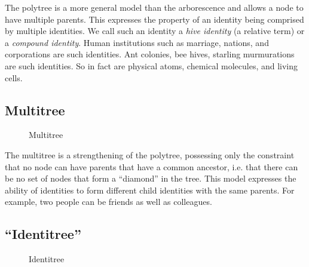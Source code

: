 \documentclass[pra,twocolumn,groupedaddress,10pt]{revtex4}
\theoremstyle{definition}
\begin{document}
The polytree\cite{polytree} is a more general model than the arborescence and allows a node to have multiple parents. This expresses the property of an identity being comprised by multiple identities. We call such an identity a \textit{hive identity} (a relative term) or a \textit{compound identity}. Human institutions such as marriage, nations, and corporations are such identities. Ant colonies, bee hives, starling murmurations are such identities. So in fact are physical atoms, chemical molecules, and living cells. %

\subsection{Multitree} \label{sec:multitree}

\begin{figure}[htp]
\centering
{}
\caption{\label{fig:multitree}Multitree}
\end{figure}

The multitree\cite{multitree} is a strengthening of the polytree, possessing only the constraint that no node can have parents that have a common ancestor, i.e. that there can be no set of nodes that form a ``diamond'' in the tree. This model expresses the ability of identities to form different child identities with the same parents. For example, two people can be friends as well as colleagues.

\subsection{``Identitree''} \label{sec:identitree}

\begin{figure}[htp]
\centering
{}
\caption{\label{fig:identitree}Identitree}
\end{figure}
\end{document}
